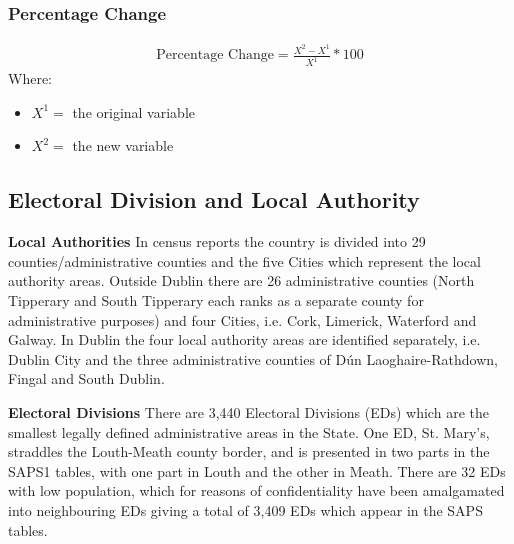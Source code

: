 \subsubsection{Percentage Change}

\begin{align}
\text{Percentage Change} = \frac{X^{2} - X^{1}}{X^{1}}*100  
\end{align}
Where: 
\vspace{-7mm} 
\begin{itemize}
	\item $X^{1} = $ the original variable
	\item $X^{2} = $ the new variable
\end{itemize}


\subsection{Electoral Division and Local Authority}
\textbf{Local Authorities}
In census reports the country is divided into 29 counties/administrative counties and the five Cities which represent the
local authority areas. Outside Dublin there are 26 administrative counties (North Tipperary and South Tipperary each
ranks as a separate county for administrative purposes) and four Cities, i.e. Cork, Limerick, Waterford and Galway. In
Dublin the four local authority areas are identified separately, i.e. Dublin City and the three administrative counties of
Dún Laoghaire-Rathdown, Fingal and South Dublin.

\textbf{Electoral Divisions}
There are 3,440 Electoral Divisions (EDs) which are the smallest legally defined administrative areas in the State. One ED, St. Mary's, straddles the Louth-Meath county border, and is presented in two parts in the SAPS1 tables, with one part in Louth and the other in Meath. There are 32 EDs with low population, which for reasons of confidentiality have been amalgamated into neighbouring EDs giving a total of 3,409 EDs which appear in the SAPS tables.

